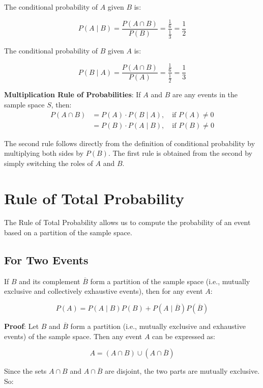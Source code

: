 \documentclass[twoside]{book}
\begin{document}
The conditional probability of \( A \) given \( B \) is:

\[
P(A \mid B) = \frac{P(A \cap B)}{P(B)} = \dfrac{\frac{1}{6}}{\frac{1}{3}}  = \frac{1}{2}
\]

The conditional probability of \( B \) given \( A \) is:

\[
P(B \mid A) = \frac{P(A \cap B)}{P(A)} =\frac{\frac{1}{6}}{\frac{1}{2}} = \frac{1}{3}
\]

\begin{textbox}
\textbf{Multiplication Rule of Probabilities}: If \( A \) and \( B \) are any events in the sample space \( S \), then:
\begin{align*}
    P(A \cap B) &= P(A) \cdot P(B \mid A), \quad \text{if } P(A) \neq 0 \\
 &= P(B) \cdot P(A \mid B), \quad \text{if } P(B) \neq 0
\end{align*}
\end{textbox}
The second rule follows directly from the definition of conditional probability by multiplying both sides by \( P(B) \).
The first rule is obtained from the second by simply switching the roles of \( A \) and \( B \).

\section{Rule of Total Probability}

The Rule of Total Probability allows us to compute the probability of an event based on a partition of the sample space.

\subsection{For Two Events}
\begin{textbox}
    If \( B \) and its complement \( \overline{B} \) form a partition of the sample space (i.e., mutually exclusive and collectively exhaustive events), then for any event \( A \):

\[
P(A) = P(A \mid B)P(B) + P(A \mid \overline{B})P(\overline{B})
\]
\end{textbox}
\textbf{Proof}: Let \( B \) and \( \overline{B} \) form a partition (i.e., mutually exclusive and exhaustive events) of the sample space. Then any event \( A \) can be expressed as:

\[
A = (A \cap B) \cup (A \cap \overline{B})
\]

Since the sets \( A \cap B \) and \( A \cap \overline{B} \) are disjoint, the two parts are mutually exclusive. So:
\end{document}
